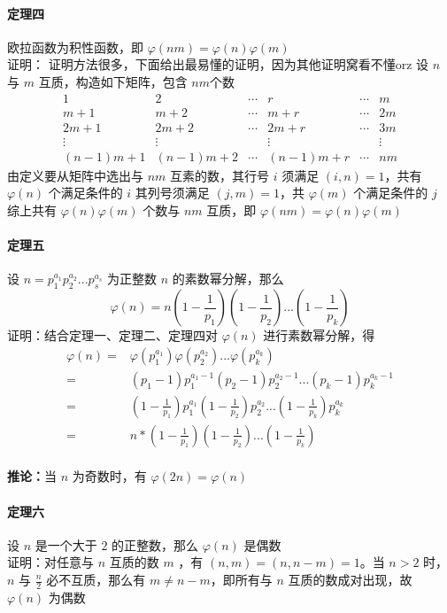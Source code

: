 	\paragraph{定理四}欧拉函数为积性函数，即 $\varphi (nm)=\varphi(n)\varphi(m)$\\
	证明：
	证明方法很多，下面给出最易懂的证明，因为其他证明窝看不懂orz
	设 $n$ 与 $m$ 互质，构造如下矩阵，包含 $nm$个数
	$$
	\begin{matrix}
	1&2&\cdots&r&\cdots&m\\
	m+1&m+2&\cdots&m+r&\cdots&2m\\
	2m+1&2m+2&\cdots&2m+r&\cdots&3m\\
	\vdots&\vdots&&\vdots&&\vdots\\
	(n-1)m+1&(n-1)m+2&\cdots&(n-1)m+r&\cdots&nm
	\end{matrix}
	$$
	由定义要从矩阵中选出与 $nm$ 互素的数，其行号 $i$ 须满足 $(i,n)=1$，共有 $\varphi(n)$ 个满足条件的 $i$	其列号须满足 $(j,m)=1$，共 $\varphi(m)$ 个满足条件的 $j$\\
	综上共有 $\varphi(n)\varphi(m)$ 个数与 $nm$ 互质，即 $\varphi (nm)=\varphi(n)\varphi(m)$\\
	\paragraph{定理五}设 $n=p_1^{a_1}p_2^{a_2}...p_s^{a_s}$ 为正整数 $n$ 的素数幂分解，那么
	$$
	\varphi(n)=n(1-\frac{1}{p_1})(1-\frac{1}{p_2})...(1-\frac{1}{p_k})
	$$
	证明：结合定理一、定理二、定理四对 $\varphi(n)$ 进行素数幂分解，得
	$$
	\begin{aligned}
	\varphi(n)=&\varphi(p_1^{a_1})\varphi(p_2^{a_2})...\varphi(p_k^{a_k})\\  =&(p_1-1)p_1^{a_1-1}(p_2-1)p_2^{a_2-1}...(p_k-1)p_k^{a_k-1}\\ =&(1-\frac{1}{p_1})p_1^{a_1}(1-\frac{1}{p_2})p_2^{a_2}...(1-\frac{1}{p_k})p_k^{a_k}\\ =&n*(1-\frac{1}{p_1})(1-\frac{1}{p_2})...(1-\frac{1}{p_k})
	\end{aligned}
	$$\\
	\textbf{推论：}当 $n$ 为奇数时，有 $\varphi(2n)=\varphi(n)$\\
	\paragraph{定理六}设 $n$ 是一个大于 $2$ 的正整数，那么 $\varphi(n)$ 是偶数\\
	证明：对任意与 $n$ 互质的数 $m$ ，有 $(n,m)=(n,n-m)=1$。当 $n>2$ 时，$n$ 与 $\frac{n}{2}$ 必不互质，那么有 $m\neq n-m$，即所有与 $n$ 互质的数成对出现，故 $\varphi(n)$ 为偶数\\
